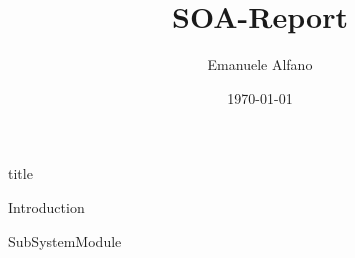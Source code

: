 \documentclass[a4paper,10pt]{article}
\title{SOA-Report}
\author{Emanuele Alfano}
\date{\today}
\begin{document}

{title}

\frontmatter

\tableofcontents


\mainmatter


{Introduction}

{SubSystemModule}


\newpage
\printbibliography[heading = bibintoc]    %
\end{document}
